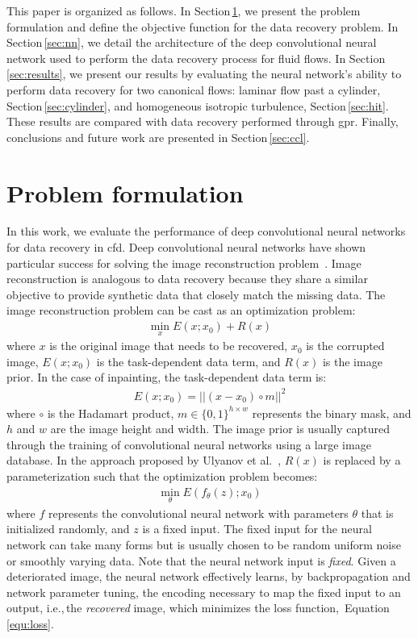 \documentclass[review]{elsarticle}
\begin{document}
This paper is organized as follows. In Section\,\ref{sec:formulation}, we
present the problem formulation and define the objective function for
the data recovery problem. In Section\,\ref{sec:nn}, we detail the
architecture of the deep convolutional neural network used to perform
the data recovery process for fluid flows. In Section\,\ref{sec:results}, we
present our results by evaluating the neural network's ability to
perform data recovery for two canonical flows: laminar flow past a
cylinder, Section\,\ref{sec:cylinder}, and homogeneous isotropic turbulence,
Section\,\ref{sec:hit}. These results are compared with data recovery
performed through \gls{gpr}. Finally, conclusions and future work are
presented in Section\,\ref{sec:ccl}.

\section{Problem formulation}\label{sec:formulation}

In this work, we evaluate the performance of deep convolutional neural
networks for data recovery in \gls{cfd}. Deep convolutional neural
networks have shown particular success for solving the image
reconstruction problem~\cite{Goodfellow2014}. Image reconstruction is
analogous to data recovery because they share a similar objective to
provide synthetic data that closely match the missing data. The
image reconstruction problem can be cast as an optimization problem:
\begin{align}
  \min_x{E(x;x_0) + R(x)}
\end{align}
where $x$ is the original image that needs to be recovered, $x_0$ is
the corrupted image, $E(x;x_0)$ is the task-dependent data term, and
$R(x)$ is the image prior. In the case of inpainting, the
task-dependent data term is:
\begin{align}
  E(x;x_0) = || (x-x_0) \circ m||^2
\end{align}
where $\circ$ is the Hadamart product, $m \in \{0,1\}^{h\times w}$
represents the binary mask, and $h$ and $w$ are the image height and
width. The image prior is usually captured through the training of
convolutional neural networks using a large image database. In the
approach proposed by Ulyanov et al.~\cite{Ulyanov2017}, $R(x)$ is replaced by a
parameterization such that the optimization problem becomes:
\begin{align}
  \min_\theta{E(f_\theta(z); x_0)} \label{equ:loss}
\end{align}
where $f$ represents the convolutional neural network with parameters
$\theta$ that is initialized randomly, and $z$ is a fixed input. The
fixed input for the neural network can take many forms but is usually
chosen to be random uniform noise or smoothly varying data.
Note that the neural network input is \textit{fixed}. Given a
deteriorated image, the neural network effectively learns, by
backpropagation and network parameter tuning, the encoding necessary
to map the fixed input to an output, i.e.,\,the \textit{recovered}
image, which minimizes the loss function,~Equation\,\ref{equ:loss}.
\end{document}
